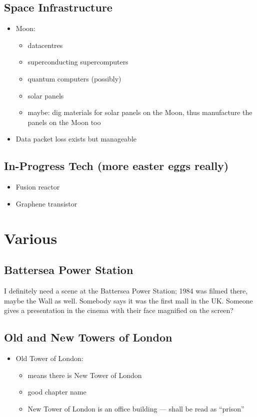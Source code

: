 \documentclass[12pt]{article}
\begin{document}
\subsection{Space Infrastructure}

\begin{itemize}
  \item Moon:
  \begin{itemize}
    \item datacentres
    \item superconducting supercomputers
    \item quantum computers (possibly)
    \item solar panels
    \item maybe: dig materials for solar panels on the Moon, thus manufacture the panels on the Moon too
  \end{itemize}
  \item Data packet loss exists but manageable
\end{itemize}

\subsection{In-Progress Tech (more easter eggs really)}

\begin{itemize}
  \item Fusion reactor
  \item Graphene transistor
\end{itemize}

\section{Various}

\subsection{Battersea Power Station}

I definitely need a scene at the Battersea Power Station; 1984 was filmed there, maybe the Wall as well. Somebody says it was the first mall in the UK. Someone gives a presentation in the cinema with their face magnified on the screen?

\subsection{Old and New Towers of London}

\begin{itemize}
  \item Old Tower of London:
  \begin{itemize}
    \item means there is New Tower of London
    \item good chapter name
    \item New Tower of London is an office building — shall be read as “prison”
  \end{itemize}
\end{itemize}
\end{document}

